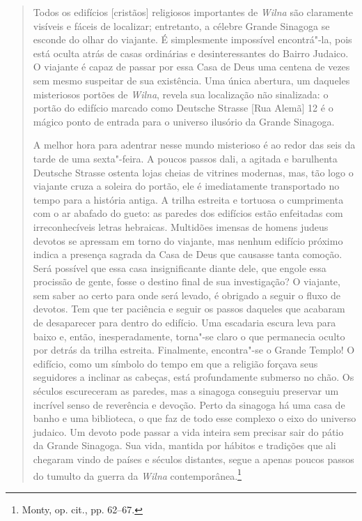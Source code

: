 \begin{quote}
Todos os edifícios {[}cristãos{]} religiosos importantes de \textit{Wilna} são
claramente visíveis e fáceis de localizar; entretanto, a célebre Grande
Sinagoga se esconde do olhar do viajante. É simplesmente impossível
encontrá"-la, pois está oculta atrás de casas ordinárias e
desinteressantes do Bairro Judaico. O viajante é capaz de passar por
essa Casa de Deus uma centena de vezes sem mesmo suspeitar de sua
existência. Uma única abertura, um daqueles misteriosos portões de
\textit{Wilna}, revela sua localização não sinalizada: o portão do edifício
marcado como Deutsche Strasse {[}Rua Alemã{]} 12 é o mágico ponto de
entrada para o universo ilusório da Grande Sinagoga.

A melhor hora para adentrar nesse mundo misterioso é ao redor das seis
da tarde de uma sexta"-feira. A poucos passos dali, a agitada e
barulhenta Deutsche Strasse ostenta lojas cheias de vitrines modernas,
mas, tão logo o viajante cruza a soleira do portão, ele é imediatamente
transportado no tempo para a história antiga. A trilha estreita e
tortuosa o cumprimenta com o ar abafado do gueto: as paredes dos
edifícios estão enfeitadas com irreconhecíveis letras hebraicas.
Multidões imensas de homens judeus devotos se apressam em torno do
viajante, mas nenhum edifício próximo indica a presença sagrada da Casa
de Deus que causasse tanta comoção. Será possível que essa casa
insignificante diante dele, que engole essa procissão de gente, fosse o
destino final de sua investigação? O viajante, sem saber ao certo para
onde será levado, é obrigado a seguir o fluxo de devotos. Tem que ter
paciência e seguir os passos daqueles que acabaram de desaparecer para
dentro do edifício. Uma escadaria escura leva para baixo e, então,
inesperadamente, torna"-se claro o que permanecia oculto por detrás da
trilha estreita. Finalmente, encontra"-se o Grande Templo! O edifício,
como um símbolo do tempo em que a religião forçava seus seguidores a
inclinar as cabeças, está profundamente submerso no chão. Os séculos
escureceram as paredes, mas a sinagoga conseguiu preservar um incrível
senso de reverência e devoção. Perto da sinagoga há uma casa de banho e
uma biblioteca, o que faz de todo esse complexo o eixo do universo
judaico. Um devoto pode passar a vida inteira sem precisar sair do pátio
da Grande Sinagoga. Sua vida, mantida por hábitos e tradições que ali
chegaram vindo de países e séculos distantes, segue a apenas poucos
passos do tumulto da guerra da \textit{Wilna} contemporânea.\footnote{Monty, op. cit., pp. 62--67.} 
\end{quote}

